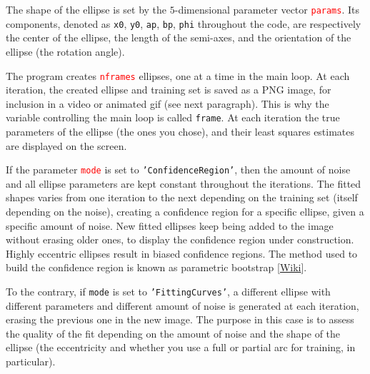 \documentclass[oneside,10pt]{book}
\begin{document}
The shape of the ellipse is set by the $5$-dimensional parameter vector \textcolor{red}{\texttt{params}}. Its components, denoted
 as \texttt{x0}, \texttt{y0}, \texttt{ap}, \texttt{bp}, \texttt{phi} throughout the code, are respectively the center of the ellipse, the length of the semi-axes, and the orientation of the ellipse (the rotation angle). \vspace{1ex}

 \vspace{1ex}

\noindent The program creates \textcolor{red}{\texttt{nframes}} ellipses, one at a time in the main loop.
 At each iteration, the created ellipse and training set is saved as a PNG image, for inclusion in a video or animated gif (see next paragraph). This is why the variable controlling the main loop is called  \texttt{frame}. At each iteration the true parameters of the ellipse (the ones you chose), and their least squares estimates are displayed on the screen. 

If the parameter \textcolor{red}{\texttt{mode}} is set to \texttt{'ConfidenceRegion'}, then the amount of noise and all ellipse parameters are kept constant throughout the iterations. The fitted shapes varies from one iteration to the next depending on the training set (itself depending on the noise), creating a \textcolor{index}{confidence region} for a specific ellipse, given a specific amount of noise. New fitted ellipses keep being added to the image without erasing older ones, to display the confidence region under construction. Highly eccentric ellipses result in biased confidence regions.
 The method used to build the confidence region is known as \textcolor{index}{parametric bootstrap} [\href{https://en.wikipedia.org/wiki/Bootstrapping_(statistics)#Parametric_bootstrap}{Wiki}]. 

To the contrary, if \texttt{mode} is set to \texttt{'FittingCurves'}, a different ellipse with different parameters and different amount of noise is generated at each iteration, erasing the previous one in the new image. The purpose in this case is to assess the quality of the fit depending on the amount of noise and 
 the shape of the ellipse (the eccentricity and whether you use a full or partial arc for training, in particular).\vspace{1ex}

 \vspace{1ex}
\end{document}
